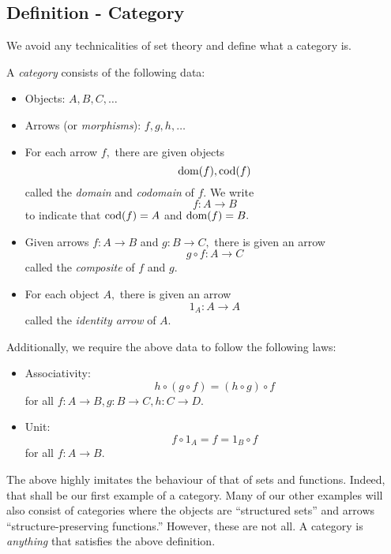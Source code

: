 \subsection{Definition - Category}
We avoid any technicalities of set theory and define what a category is.
\begin{defn} 
	A \emph{category} consists of the following data:
	\begin{itemize}
		\item Objects: $A, B, C, \ldots$
		\item Arrows (or \emph{morphisms}): $f, g, h, \ldots$
		\item For each arrow $f,$ there are given objects
		\[\operatorname{dom}(f), \operatorname{cod}(f)\]
		called the \emph{domain} and \emph{codomain} of $f.$ We write 
		\[f:A \to B\]
		to indicate that $\operatorname{cod}(f) = A$ and $\operatorname{dom}(f) = B.$
		\item Given arrows $f:A\to B$ and $g:B\to C,$ there is given an arrow
		\[g\circ f : A \to C\]
		called the \emph{composite} of $f$ and $g.$
		\item For each object $A,$ there is given an arrow
		\[1_A : A \to A\]
		called the \emph{identity arrow} of $A.$
	\end{itemize}
	Additionally, we require the above data to follow the following laws:
	\begin{itemize}
		\item Associativity:
		\[h \circ (g \circ f) = (h \circ g) \circ f\]
		for all $f : A \to B, g: B \to C, h : C \to D.$
		\item Unit:
		\[f\circ 1_A = f = 1_B \circ f\]
		for all $f:A\to B.$
	\end{itemize}
\end{defn}
The above highly imitates the behaviour of that of sets and functions. Indeed, that shall be our first example of a category. Many of our other examples will also consist of categories where the objects are ``structured sets'' and arrows ``structure-preserving functions.'' However, these are not all. A category is \emph{anything} that satisfies the above definition.
